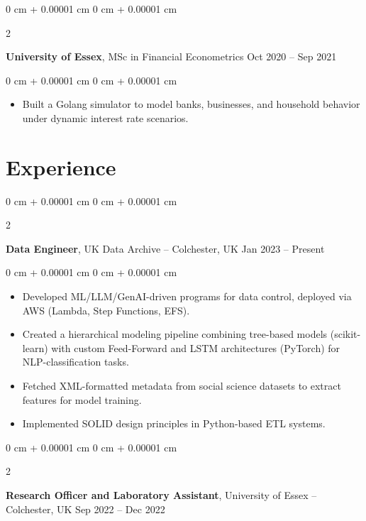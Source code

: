 \documentclass[10pt, letterpaper]{article}
\newenvironment{highlights}{
    \begin{itemize}[
        topsep=0.10 cm,
        parsep=0.10 cm,
        partopsep=0pt,
        itemsep=0pt,
        leftmargin=0 cm + 10pt
    ]
}{
    \end{itemize}
} %
\newenvironment{onecolentry}{
    \begin{adjustwidth}{
        0 cm + 0.00001 cm
    }{
        0 cm + 0.00001 cm
    }
}{
    \end{adjustwidth}
} %
\newenvironment{twocolentry}[2][]{
    \onecolentry
    \def\secondColumn{#2}
    \setcolumnwidth{\fill, 4.5 cm}
    \begin{paracol}{2}
}{
    \switchcolumn \raggedleft \secondColumn
    \end{paracol}
    \endonecolentry
} %
\begin{document}
    
        \begin{twocolentry}{
            Oct 2020 – Sep 2021 
        }
            \textbf{University of Essex}, MSc in Financial Econometrics\end{twocolentry}

        \vspace{0.10 cm}
        \begin{onecolentry}
            \begin{highlights}
            \item Built a Golang simulator to model banks, businesses, and household behavior under dynamic interest rate scenarios.
            \end{highlights}
        \end{onecolentry}

    \section{Experience}

        
        \begin{twocolentry}{
            Jan 2023  – Present
        }
            \textbf{Data Engineer}, UK Data Archive -- Colchester, UK\end{twocolentry}

        \vspace{0.10 cm}
        \begin{onecolentry}
            \begin{highlights}
              \item Developed ML/LLM/GenAI-driven programs for data control, deployed via AWS (Lambda, Step Functions, EFS).
              \item Created a hierarchical modeling pipeline combining tree-based models (scikit-learn) with custom Feed-Forward and LSTM architectures (PyTorch) for NLP-classification tasks.
              \item Fetched XML-formatted metadata from social science datasets to extract features for model training.
              \item Implemented SOLID design principles in Python-based ETL systems.
            \end{highlights}
        \end{onecolentry}


        \vspace{0.2 cm}

        \begin{twocolentry}{
            Sep 2022 – Dec 2022
        }
            \textbf{Research Officer and Laboratory Assistant}, University of Essex -- Colchester, UK\end{twocolentry}
\end{document}
